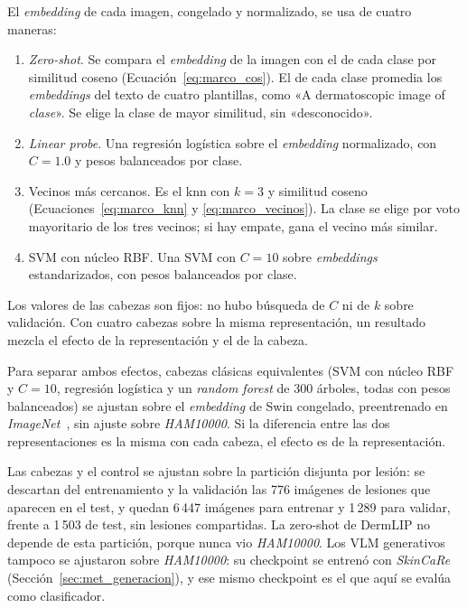 El \emph{embedding} de cada imagen, congelado y normalizado, se usa de cuatro maneras:
\begin{enumerate}[leftmargin=1.6em]
  \item \emph{Zero-shot}. Se compara el \emph{embedding} de la imagen con el de cada clase por similitud coseno
  (Ecuación~\ref{eq:marco_cos}). El de cada clase promedia los \emph{embeddings} del texto de cuatro plantillas, como
  «A dermatoscopic image of \emph{clase}». Se elige la clase de mayor similitud, sin «desconocido».
  \item \emph{Linear probe}. Una regresión logística sobre el \emph{embedding} normalizado, con $C = 1.0$ y pesos
  balanceados por clase.
  \item Vecinos más cercanos. Es el \gls{knn} con $k = 3$ y similitud coseno (Ecuaciones~\ref{eq:marco_knn} y
  \ref{eq:marco_vecinos}). La clase se elige por voto mayoritario de los tres vecinos; si hay empate, gana el vecino
  más similar.
  \item SVM con núcleo RBF. Una SVM con $C = 10$ sobre \emph{embeddings} estandarizados, con pesos balanceados
  por clase.
\end{enumerate}
Los valores de las cabezas son fijos: no hubo búsqueda de $C$ ni de $k$ sobre validación.
Con cuatro cabezas sobre la misma representación, un resultado mezcla el efecto de la representación y el de la cabeza.

Para separar ambos efectos, cabezas clásicas equivalentes (SVM con núcleo RBF y $C = 10$, regresión logística y un
\emph{random forest} de 300 árboles, todas con pesos balanceados) se ajustan sobre el \emph{embedding} de Swin congelado, preentrenado en
\emph{ImageNet}~\cite{liu2021swin}, sin ajuste sobre \emph{HAM10000}. Si la diferencia entre las dos representaciones
es la misma con cada cabeza, el efecto es de la representación.

Las cabezas y el control se ajustan sobre la partición disjunta por lesión: se descartan del entrenamiento y la
validación las 776 imágenes de lesiones que aparecen en el test, y quedan 6\,447 imágenes para entrenar y 1\,289 para
validar, frente a 1\,503 de test, sin lesiones compartidas. La zero-shot de DermLIP no depende de esta partición, porque
nunca vio \emph{HAM10000}. Los VLM generativos tampoco se ajustaron sobre \emph{HAM10000}: su checkpoint se entrenó con
\emph{SkinCaRe} (Sección~\ref{sec:met_generacion}), y ese mismo checkpoint es el que aquí se evalúa como clasificador.

